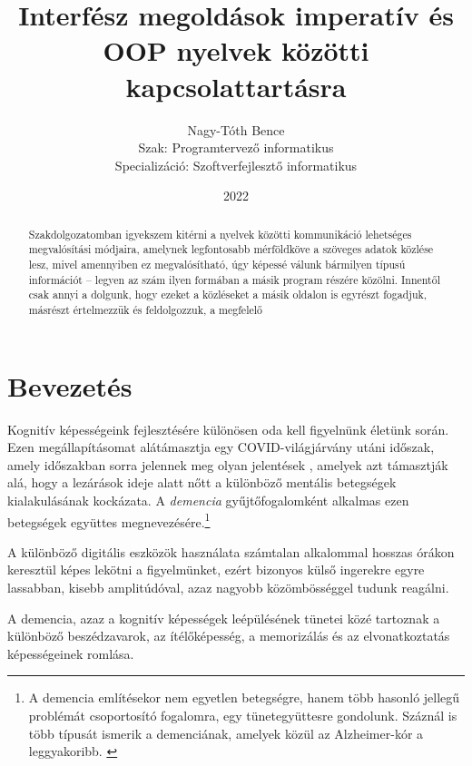 \documentclass[tocnopagenum]{thesis-ekf}
\theoremstyle{definition}
\theoremstyle{remark}
\begin{document}
	\title{Interfész megoldások imperatív és OOP nyelvek közötti kapcsolattartásra}
	\author{Nagy-Tóth Bence\\Szak: Programtervező informatikus\\Specializáció: Szoftverfejlesztő informatikus}
	\date{2022}
	\maketitle
	\tableofcontents
	\begin{abstract}
		Szakdolgozatomban igyekszem kitérni a nyelvek közötti kommunikáció lehetséges megvalósítási módjaira, amelynek legfontosabb mérföldköve a szöveges adatok közlése lesz, mivel amennyiben ez megvalósítható, úgy képessé válunk bármilyen típusú információt -- legyen az szám ilyen formában a másik program részére közölni. Innentől csak annyi a dolgunk, hogy ezeket a közléseket a másik oldalon is egyrészt fogadjuk, másrészt értelmezzük és feldolgozzuk, a megfelelő 
	\end{abstract}
	\chapter*{Bevezetés}
	Kognitív képességeink fejlesztésére különösen oda kell figyelnünk életünk során. Ezen megállapításomat alátámasztja egy COVID-világjárvány utáni időszak, amely időszakban sorra jelennek meg olyan jelentések 
    \cite{brain1}, amelyek azt támasztják alá, hogy a lezárások ideje alatt nőtt a különböző mentális betegségek kialakulásának kockázata. A \textit{demencia} gyűjtőfogalomként alkalmas ezen betegségek együttes megnevezésére.\footnote{A demencia említésekor nem egyetlen betegségre, hanem több hasonló jellegű problémát  csoportosító fogalomra, egy tünetegyüttesre gondolunk. Száznál is több típusát ismerik a demenciának, amelyek közül az Alzheimer-kór a leggyakoribb. \cite{demencia_egeszsegvonal}}
    
    A különböző digitális eszközök használata számtalan alkalommal hosszas órákon keresztül képes lekötni a figyelmünket, ezért bizonyos külső ingerekre egyre lassabban, kisebb amplitúdóval, azaz nagyobb közömbösséggel tudunk reagálni. 
    
    A demencia, azaz a kognitív képességek leépülésének tünetei közé tartoznak a különböző beszédzavarok, az ítélőképesség, a memorizálás és az elvonatkoztatás képességeinek romlása.
    
\end{document}

